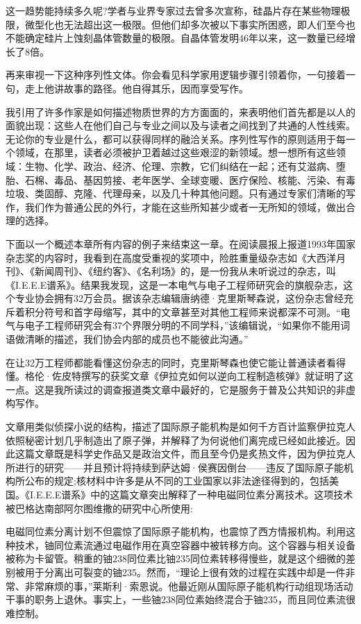 这一趋势能持续多久呢?学者与业界专家过去曾多次宣称，硅晶片存在某些物理极限，微型化也无法超出这一极限。但他们却多次被以下事实所困惑，即人们至今也不能确定硅片上蚀刻晶体管数量的极限。自晶体管发明46年以来，这一数量已经增长了8倍。

再来审视一下这种序列性文体。你会看见科学家用逻辑步骤引领着你，一句接着一句，走上他讲故事的路径。他自得其乐，因而享受写作。

我引用了许多作家是如何描述物质世界的方方面面的，来表明他们首先都是以人的面貌出现：这些人在他们自己与专业之间以及与读者之间找到了共通的人性线索。无论你的专业是什么，都可以获得同样的融洽关系。序列性写作的原则适用于每一个领域，在那里，读者必须被护卫着越过这些艰涩的新领域。想一想所有这些领域：生物、化学、政治、经济、伦理、宗教，它们纠结在一起；还有艾滋病、堕胎、石棉、毒品、基因剪接、老年医学、全球变暖、医疗保险、核能、污染、有毒垃圾、类固醇、克隆、代理母亲，以及几十种其他问题。只有通过专家们清晰的写作，我们作为普通公民的外行，才能在这些所知甚少或者一无所知的领域，做出合理的选择。

下面以一个概述本章所有内容的例子来结束这一章。在阅读晨报上报道1993年国家杂志奖的内容时，我看到在高度受重视的奖项中，险胜重量级杂志如《大西洋月刊》、《新闻周刊》、《纽约客》、《名利场》的，是一份我从未听说过的杂志，叫《I.E.E.E谱系》。结果我发现，这是一本电气与电子工程师研究会的旗舰杂志，这个专业协会拥有32万会员。据该杂志编辑唐纳德·克里斯琴森说，这份杂志曾经充斥着积分符号和首字母缩写，其中的文章甚至对其他工程师来说都深不可测。“电气与电子工程师研究会有37个界限分明的不同学科，”该编辑说，“如果你不能用词语做清晰的描述，我们协会内部的成员也不能彼此沟通。”

在让32万工程师都能看懂这份杂志的同时，克里斯琴森也使它能让普通读者看得懂。格伦·佐皮特撰写的获奖文章《伊拉克如何以逆向工程制造核弹》就证明了这一点。这是我所读过的调查报道类文章中最好的，它是服务于普及公共知识的非虚构写作。

文章用类似侦探小说的结构，描述了国际原子能机构是如何千方百计监察伊拉克人依照秘密计划几乎制造出了原子弹，并解释了为何说他们离完成已经如此接近。因此这篇文章既是科学史作品又是政治文件，而且至今仍是炙热文件，因为伊拉克人所进行的研究——并且预计将持续到萨达姆·侯赛因倒台——违反了国际原子能机构所公布的规定;核材料中许多是从不同的工业国家以非法途径得到的，包括美国。《I.E.E.E谱系》中的这篇文章突出解释了一种电磁同位素分离技术。这项技术被巴格达南部阿尔图维撒的研究中心所使用:

电磁同位素分离计划不但震惊了国际原子能机构，也震惊了西方情报机构。利用这种技术，铀同位素流通过电磁作用在真空容器中被转移方向。这个容器与相关设备被称为卡留管。稍重的铀238同位素比铀235同位素转移得慢些，就是这个细微的差别被用于分离出可裂变的铀235。然而，“理论上很有效的过程在实践中却是一件非常、非常麻烦的事，”莱斯利·索恩说。他最近刚从国际原子能机构行动组现场活动干事的职务上退休。事实上，一些铀238同位素始终混合于铀235，而且同位素流很难控制。

